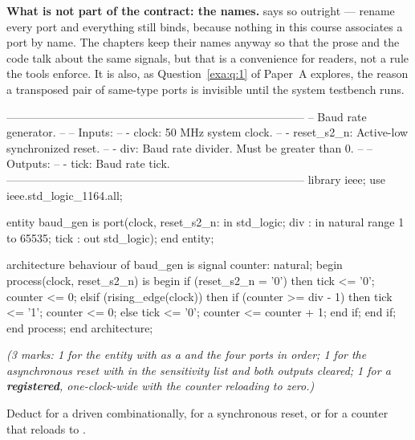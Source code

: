 \textbf{What is not part of the contract: the names.}  says so outright --- rename
every port and everything still binds, because nothing in this course associates a port by name. The
chapters keep their names anyway so that the prose and the code talk about the same signals, but
that is a convenience for readers, not a rule the tools enforce. It is also, as Question~\ref{exa:q:1}
of Paper~A explores, the reason a transposed pair of same-type ports is invisible until the system
testbench runs. 


\begin{vhdlcode}
--------------------------------------------------------------------------------
-- Baud rate generator.
--
-- Inputs:
--    - clock: 50 MHz system clock.
--    - reset_s2_n: Active-low synchronized reset.
--    - div: Baud rate divider. Must be greater than 0.
--
-- Outputs:
--    - tick: Baud rate tick.
--------------------------------------------------------------------------------
library ieee;
use ieee.std_logic_1164.all;

entity baud_gen is
    port(clock, reset_s2_n: in std_logic;
         div              : in natural range 1 to 65535;
         tick             : out std_logic);
end entity;

architecture behaviour of baud_gen is
signal counter: natural;
begin
    process(clock, reset_s2_n) is
    begin
        if (reset_s2_n = '0') then
            tick    <= '0';
            counter <= 0;
        elsif (rising_edge(clock)) then
            if (counter >= div - 1) then
                tick    <= '1';
                counter <= 0;
            else
                tick    <= '0';
                counter <= counter + 1;
            end if;
        end if;
    end process;
end architecture;
\end{vhdlcode}

{\itshape (3 marks: 1 for the entity with  as a  and the four ports in order;
1 for the asynchronous reset with  in the sensitivity list and both outputs cleared;
1 for a \textbf{registered}, one-clock-wide  with the counter reloading to zero.)\par}

\medskip
Deduct for a  driven combinationally, for a synchronous reset, or for a counter that
reloads to .

